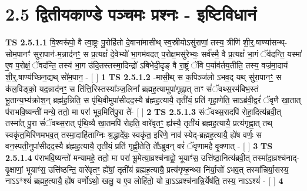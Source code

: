 \documentclass[17pt]{extarticle}
\begin{document}
     \section*{ 2.5      द्वितीयकाण्डे पञ्चमः प्रश्नः - इष्टिविधानं }
                                        \textbf{ TS 2.5.1.1} \newline
                  वि॒श्वरू॑पो॒ वै त्वा॒ष्ट्रः पु॒रोहि॑तो दे॒वाना॑मासीथ् स्व॒स्रीयोऽसु॑राणां॒ तस्य॒ त्रीणि॑ शी॒र्॒.षाण्या॑सन्थ्-सोम॒पानꣳ॑ सुरा॒पान॑-म॒न्नाद॑नꣳ॒॒ स प्र॒त्यक्षं॑ दे॒वेभ्यो॑ भा॒गम॑वदत् प॒रोक्ष॒मसु॑रेभ्यः॒ सर्व॑स्मै॒ वै प्र॒त्यक्षं॑ भा॒गं ॅव॑दन्ति॒ यस्मा॑ ए॒व प॒रोक्षं॒ ॅवद॑न्ति॒ तस्य॑ भा॒ग उ॑दि॒तस्तस्मा॒दिन्द्रो॑ ऽबिभेदी॒दृङ् वै रा॒ष्ट्रं ॅवि प॒र्याव॑र्तय॒तीति॒ तस्य॒ वज्र॑मा॒दाय॑ शी॒र्॒.षाण्य॑च्छिन॒द्यथ् सो॑म॒पान॒ - [  ] \textbf{  1 } \newline
                  \newline
                                \textbf{ TS 2.5.1.2} \newline
                  -मासी॒थ् स क॒पिञ्ज॑लो ऽभव॒द् यथ् सु॑रा॒पानꣳ॒॒ स क॑ल॒विङ्को॒ यद॒न्नाद॑नꣳ॒॒ स ति॑त्ति॒रिस्तस्या᳚ञ्ज॒लिना᳚ ब्रह्मह॒त्यामुपा॑गृह्णा॒त् ताꣳ सं॑ॅवथ्स॒रम॑बिभ॒स्तं भू॒तान्य॒भ्य॑क्रोश॒न् ब्रह्म॑ह॒न्निति॒ स पृ॑थि॒वीमुपा॑सीदद॒स्यै ब्र॑ह्मह॒त्यायै॒ तृती॑यं॒ प्रति॑ गृहा॒णेति॒ साऽब्र॑वी॒द्वरं॑ ॅवृणै खा॒तात् प॑राभवि॒ष्यन्ती॑ मन्ये॒ ततो॒ मा परा॑ भूव॒मिति॑पु॒रा ते॑-  [  ] \textbf{  2} \newline
                  \newline
                                \textbf{ TS 2.5.1.3} \newline
                  संॅवथ्स॒रादपि॑ रोहा॒दित्य॑ब्रवी॒त् तस्मा᳚त् पु॒रा सं॑ॅवथ्स॒रात् पृ॑थि॒व्यै खा॒तमपि॑ रोहति॒ वारे॑वृतꣳ॒॒ ह्य॑स्यै॒ तृती॑यं ब्रह्मह॒त्यायै॒ प्रत्य॑गृह्णा॒त् तथ् स्वकृ॑त॒मिरि॑णमभव॒त् तस्मा॒दाहि॑ताग्निः श्र॒द्धादे॑वः॒ स्वकृ॑त॒ इरि॑णे॒ नाव॑ स्येद्-ब्रह्मह॒त्यायै॒ ह्ये॑ष वर्णः॒ स वन॒स्पती॒नुपा॑सीदद॒स्यै ब्र॑ह्मह॒त्यायै॒ तृती॑यं॒ प्रति॑ गृह्णी॒तेति॒ ते᳚ऽब्रुव॒न् वरं॑ ॅवृणामहै वृ॒क्णात् - [  ] \textbf{  3} \newline
                  \newline
                                \textbf{ TS 2.5.1.4} \newline
                  प॑राभवि॒ष्यन्तो॑ मन्यामहे॒ ततो॒ मा परा॑ भू॒मेत्या॒व्रश्च॑नाद्वो॒ भूयाꣳ॑स॒ उत्ति॑ष्ठा॒नित्य॑ब्रवी॒त् तस्मा॑दा॒व्रश्च॑नाद्-वृ॒क्षाणां॒ भूयाꣳ॑स॒ उत्ति॑ष्ठन्ति॒ वारे॑वृतꣳ॒॒ ह्ये॑षां॒ तृती॑यं ब्रह्मह॒त्यायै॒ प्रत्य॑गृण्ह॒न्थ्स नि॑र्या॒सो॑ ऽभव॒त् तस्मा᳚न्निर्या॒सस्य॒ नाऽऽ*श्यं॑ ब्रह्मह॒त्यायै॒ ह्ये॑ष वर्णोऽथो॒ खलु॒ य ए॒व लोहि॑तो॒ यो वा॒ऽऽव्रश्च॑नान्नि॒र्येष॑ति॒ तस्य॒ नाऽऽश्यं॑ - [  ] \textbf{  4} \newline
\end{document}
